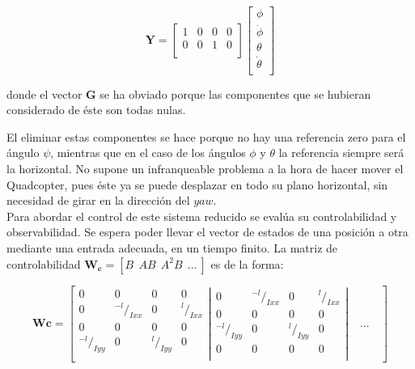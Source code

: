 \documentclass[twoside,11pt]{book}
\begin{document}
\begin{equation}
\nonumber
\pmb{Y}=\left[ \begin{array}{cccccc}
1 & 0 & 0 & 0 \\
0 & 0 & 1 & 0 \\ \end{array} \right] \left[ \begin{array}{c}
\phi \\
\dot{\phi} \\
\theta \\
\dot{\theta} \\ \end{array} \right]
\end{equation} 

donde el vector $\pmb{G}$ se ha obviado porque las componentes que se hubieran considerado de éste son todas nulas. 

El eliminar estas componentes se hace porque no hay una referencia zero para el ángulo $\psi$, mientras que en el caso de los ángulos $\phi$ y $\theta$ la referencia siempre será la horizontal. No supone un infranqueable problema a la hora de hacer mover el Quadcopter, pues éste ya se puede desplazar en todo su plano horizontal, sin necesidad de girar en la dirección del $yaw$.\\

Para abordar el control de este sistema reducido se evalúa su controlabilidad y observabilidad. Se espera poder llevar el vector de estados de una posición a otra mediante una entrada adecuada, en un tiempo finito. La matriz de controlabilidad $\pmb{W_c}=[B \>\> AB \>\> A^{2}B \>\> ... \>]$ es de la forma:

\begin{equation}
\pmb{Wc}=\left[ \left.{\begin{array}{cccc}
0 & 0 & 0 & 0 \\
0 & {}^{-l}/_{Ixx} & 0 & {}^{l}/_{Ixx} \\ 
0 & 0 & 0 & 0 \\
{}^{-l}/_{Iyy} & 0 & {}^{l}/_{Iyy} & 0 \\ \end{array}}\right\vert_{} \left.{\begin{array}{cccc}
0 & {}^{-l}/_{Ixx} & 0 & {}^{l}/_{Ixx} \\
0 & 0 & 0 & 0 \\
{}^{-l}/_{Iyy} & 0 & {}^{l}/_{Iyy} & 0 \\
0 & 0 & 0 & 0 \\
\end{array}}\right\vert_{} \quad ... \quad \right]
\end{equation}
\end{document}
